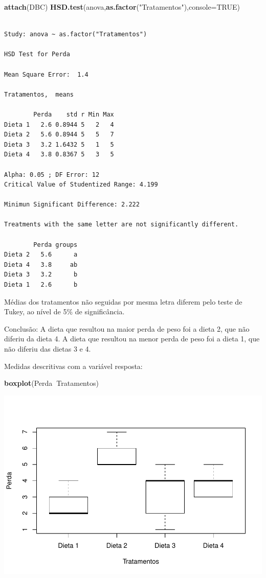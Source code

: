 \documentclass[12pt,brazil,oneside]{book}
\newenvironment{Shaded}{\begin{snugshade}}{\end{snugshade}}
\newcommand{\DataTypeTok}[1]{\textcolor[rgb]{0.13,0.29,0.53}{#1}}
\newcommand{\KeywordTok}[1]{\textcolor[rgb]{0.13,0.29,0.53}{\textbf{#1}}}
\newcommand{\NormalTok}[1]{#1}
\newcommand{\OperatorTok}[1]{\textcolor[rgb]{0.81,0.36,0.00}{\textbf{#1}}}
\newcommand{\OtherTok}[1]{\textcolor[rgb]{0.56,0.35,0.01}{#1}}
\newcommand{\StringTok}[1]{\textcolor[rgb]{0.31,0.60,0.02}{#1}}
\begin{document}
\begin{Shaded}
\begin{Highlighting}[]
\KeywordTok{attach}\NormalTok{(DBC)}
\KeywordTok{HSD.test}\NormalTok{(anova,}\KeywordTok{as.factor}\NormalTok{(}\StringTok{"Tratamentos"}\NormalTok{),}\DataTypeTok{console=}\OtherTok{TRUE}\NormalTok{)}
\end{Highlighting}
\end{Shaded}

\begin{verbatim}

Study: anova ~ as.factor("Tratamentos")

HSD Test for Perda 

Mean Square Error:  1.4 

Tratamentos,  means

        Perda    std r Min Max
Dieta 1   2.6 0.8944 5   2   4
Dieta 2   5.6 0.8944 5   5   7
Dieta 3   3.2 1.6432 5   1   5
Dieta 4   3.8 0.8367 5   3   5

Alpha: 0.05 ; DF Error: 12 
Critical Value of Studentized Range: 4.199 

Minimun Significant Difference: 2.222 

Treatments with the same letter are not significantly different.

        Perda groups
Dieta 2   5.6      a
Dieta 4   3.8     ab
Dieta 3   3.2      b
Dieta 1   2.6      b
\end{verbatim}

Médias dos tratamentos não seguidas por mesma letra diferem pelo teste
de Tukey, ao nível de 5\% de significância.

Conclusão: A dieta que resultou na maior perda de peso foi a dieta 2,
que não diferiu da dieta 4. A dieta que resultou na menor perda de peso
foi a dieta 1, que não diferiu das dietas 3 e 4.

Medidas descritivas com a variável resposta:

\begin{Shaded}
\begin{Highlighting}[]
\KeywordTok{boxplot}\NormalTok{(Perda}\OperatorTok{~}\NormalTok{Tratamentos)}
\end{Highlighting}
\end{Shaded}

\begin{center}\includegraphics[width=0.6\linewidth]{02-Delinexp_files/figure-latex/unnamed-chunk-12-1} \end{center}
\end{document}
